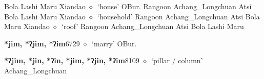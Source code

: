 \begin{list}{}{\leftmargin=1.5em \itemindent=-1.5em}
\hspace{1ex}
         Bola 
\hspace{1ex}
         Lashi 
\hspace{1ex}
         Maru 
\hspace{1ex}
         Xiandao 
\hspace{1ex}
         $\diamond$~`house'
         OBur. 
\hspace{1ex}
         Rangoon 
\hspace{1ex}
         Achang\_Longchuan 
\hspace{1ex}
         Atsi 
\hspace{1ex}
         Bola 
\hspace{1ex}
         Lashi 
\hspace{1ex}
         Maru 
\hspace{1ex}
         Xiandao 
\hspace{1ex}
         $\diamond$~`household'
         Rangoon 
\hspace{1ex}
         Achang\_Longchuan 
\hspace{1ex}
         Atsi 
\hspace{1ex}
         Bola 
\hspace{1ex}
         Maru 
\hspace{1ex}
         Xiandao 
\hspace{1ex}
         $\diamond$~`roof'
         Rangoon 
\hspace{1ex}
         Achang\_Longchuan 
\hspace{1ex}
         Atsi 
\hspace{1ex}
         Bola 
\hspace{1ex}
         Lashi 
\hspace{1ex}
         Maru 
  \item {\footnotesize \textbf{*jim, *ʔjim, *ʔim}}{\tiny 6729}
\hspace{1ex}
         $\diamond$~`marry'
         OBur. 
  \item {\footnotesize \textbf{*ʔjim, *jin, *ʔin, *jim, *ʔjin, *ʔim}}{\tiny 8109}
\hspace{1ex}
         $\diamond$~`pillar / column'
         Achang\_Longchuan 
  \end{list}
